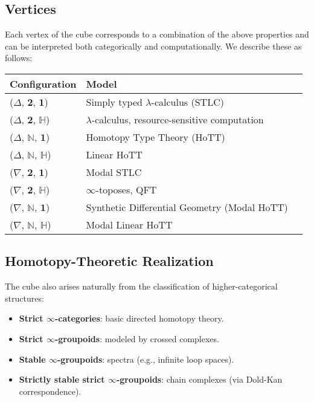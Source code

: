 \documentclass{article}
\begin{document}
\subsection{Vertices}

Each vertex of the cube corresponds to a combination of the above properties and can be interpreted both categorically and computationally. We describe these as follows:

\begin{center}
\begin{tabular}{|l|l|l|}
\hline
\textbf{Configuration} & \textbf{Model} \\
\hline
($\Delta$, $\mathbf{2}$, $\mathbf{1}$) & Simply typed $\lambda$-calculus (STLC) \\
($\Delta$, $\mathbf{2}$, $\mathbb{H}$) & $\lambda$-calculus, resource-sensitive computation \\
($\Delta$, $\mathbb{N}$, $\mathbf{1}$) & Homotopy Type Theory (HoTT) \\
($\Delta$, $\mathbb{N}$, $\mathbb{H}$) & Linear HoTT \\
($\nabla$, $\mathbf{2}$, $\mathbf{1}$) & Modal STLC \\
($\nabla$, $\mathbf{2}$, $\mathbb{H}$) & $\infty$-toposes, QFT \\
($\nabla$, $\mathbb{N}$, $\mathbf{1}$) & Synthetic Differential Geometry (Modal HoTT) \\
($\nabla$, $\mathbb{N}$, $\mathbb{H}$) & Modal Linear HoTT \\
\hline
\end{tabular}
\end{center}

\subsection{Homotopy-Theoretic Realization}

The cube also arises naturally from the classification of higher-categorical structures:

\begin{itemize}
\item \textbf{Strict $\infty$-categories}: basic directed homotopy theory.
\item \textbf{Strict $\infty$-groupoids}: modeled by crossed complexes.
\item \textbf{Stable $\infty$-groupoids}: spectra (e.g., infinite loop spaces).
\item \textbf{Strictly stable strict $\infty$-groupoids}: chain complexes (via Dold-Kan correspondence).
\end{itemize}
\end{document}
